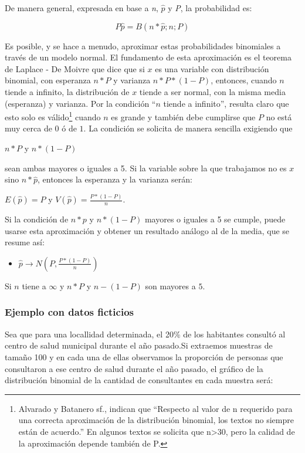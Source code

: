 \documentclass[]{book}
\providecommand{\tightlist}{%
  \setlength{\itemsep}{0pt}\setlength{\parskip}{0pt}}
\let\rmarkdownfootnote\footnote%
\def\footnote{\protect\rmarkdownfootnote}
\begin{document}
De manera general, expresada en base a \emph{n}, \(\widehat{p}\) y \emph{P}, la
probabilidad es:

\[P\widehat{p} = B(n*\widehat{p};n;P)\]

Es posible, y se hace a menudo, aproximar estas probabilidades
binomiales a través de un modelo normal. El fundamento de esta
aproximación es el teorema de Laplace - De Moivre que dice que si \(x\) es una variable con distribución binomial, con esperanza \(n*P\) y varianza \(n*P*(1-P)\), entonces, cuando \(n\) tiende a infinito, la distribución de \(x\) tiende a ser normal, con la misma media (esperanza) y varianza. Por la condición ``\(n\) tiende a infinito'', resulta claro que esto solo es válido\footnote{Alvarado y Batanero sf., indican que ``Respecto al valor de n requerido para una correcta aproximación de la distribución binomial, los textos no siempre están de acuerdo.'' En algunos textos se solicita que n\textgreater{}30, pero la calidad de la aproximación depende también de P.} cuando \(n\) es grande y también debe cumplirse que \(P\) no está muy cerca de \(0\) ó de \(1\). La condición se solicita de manera sencilla exigiendo que

\(n*P\) y \(n*(1-P)\)

sean ambas mayores o iguales a 5. Si la variable sobre la que trabajamos no es \(x\) sino \(n*\widehat{p}\), entonces la
esperanza y la varianza serán:

\(E(\widehat{p}) = P\) y
\(V(\widehat{p}) = \frac{P*(1 - P)}{n}\).

Si la condición de \(n*p\) y \(n*(1-P)\) mayores o iguales a 5 se cumple,
puede usarse esta aproximación y obtener un resultado análogo al de la
media, que se resume así:

\begin{itemize}
\tightlist
\item
  \(\widehat{p} \rightarrow N(P, \frac{P*(1-P)}{n})\)
\end{itemize}

Si \(n\) tiene a \(\infty\) y \(n*P\) y \(n-(1-P)\) son mayores a \(5\).

\hypertarget{ejemplo-con-datos-ficticios-1}{%
\subsubsection{Ejemplo con datos ficticios}\label{ejemplo-con-datos-ficticios-1}}

Sea que para una locallidad determinada, el 20\% de los habitantes consultó al centro de salud municipal durante el año pasado.Si extraemos muestras de tamaño 100 y en cada una de ellas observamos la proporción de personas que consultaron a ese centro de salud durante el año pasado, el gráfico de la distribución binomial de la cantidad de consultantes en cada muestra será:
\end{document}
